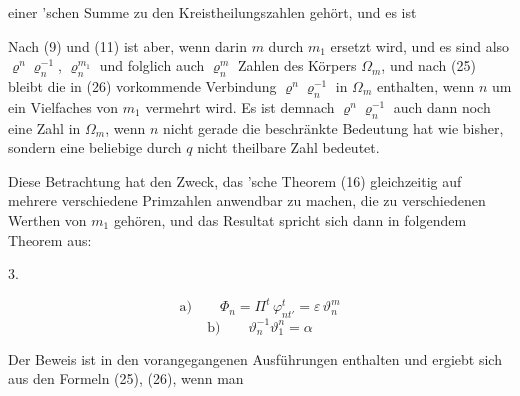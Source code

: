 einer 'schen Summe zu den Kreistheilungszahlen gehört,
und es ist

Nach (9) und (11) ist aber, wenn darin $m$ durch $m_1$ ersetzt wird,
und es sind also $\varrho^n \varrho_n^{-1}$, $\varrho_n^{m_1}$ und folglich auch $\varrho_n^m$ Zahlen des
Körpers $\Omega_m$, und nach (25) bleibt die in (26) vorkommende
Verbindung $\varrho^n \varrho_n^{-1}$ in $\Omega_m$ enthalten, wenn $n$ um ein Vielfaches
von $m_1$ vermehrt wird. Es ist demnach $\varrho^n \varrho_n^{-1}$ auch dann noch
eine Zahl in $\Omega_m$, wenn $n$ nicht gerade die beschränkte Bedeutung
hat wie bisher, sondern eine beliebige durch $q$ nicht theilbare
Zahl bedeutet.

Diese Betrachtung hat den Zweck, das 'sche
Theorem (16) gleichzeitig auf mehrere verschiedene Primzahlen
anwendbar zu machen, die zu verschiedenen Werthen von $m_1$
gehören, und das Resultat spricht sich dann in folgendem
Theorem aus:

3. 

\[ \text{a)}\qquad \Phi_n = \Pi^{t}\, \varphi^t_{nt'} = \varepsilon\,\vartheta_n^m \]
\[ \text{b)}\qquad \vartheta_n^{-1}\vartheta_1^n = \alpha \]

Der Beweis ist in den vorangegangenen Ausführungen enthalten
und ergiebt sich aus den Formeln (25), (26), wenn man
